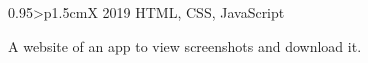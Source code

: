 \documentclass[a4paper, oneside, final]{scrartcl} %
\begin{document}
\begin{center}
\begin{paracol}{2}
\vspace{20pt}

\begin{tabularx}{0.95\linewidth}{>{\raggedleft\scshape}p{1.5cm}X}
 {}
 {2019}
 {HTML, CSS, JavaScript}
\end{tabularx}

\vspace{2mm}
\parbox{0.95\linewidth}{
A website of an app to view screenshots and download it.
}


\end{paracol}


\end{center}
\end{document}
